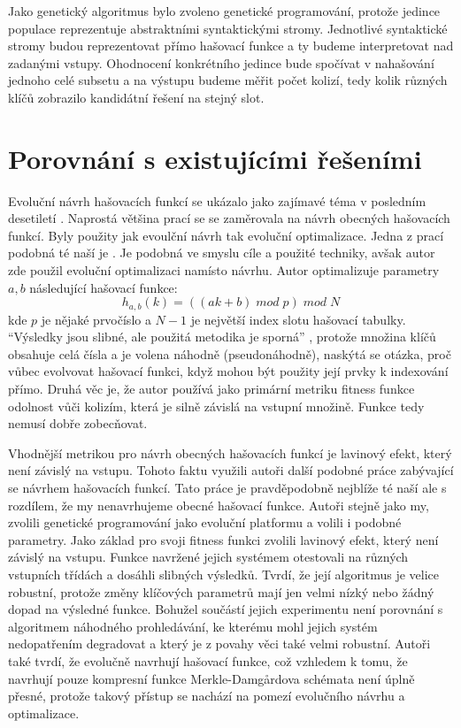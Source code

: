 Jako genetický algoritmus bylo zvoleno genetické programování, protože 
jedince populace reprezentuje abstraktními syntaktickými stromy. Jednotlivé syntaktické 
stromy budou reprezentovat přímo hašovací funkce a ty budeme interpretovat nad zadanými vstupy.
Ohodnocení konkrétního jedince bude spočívat v nahašování jednoho celé subsetu a na výstupu budeme
měřit počet kolizí, tedy kolik různých klíčů zobrazilo kandidátní řešení na stejný slot.

\section{Porovnání s existujícími řešeními}
Evoluční návrh hašovacích funkcí se ukázalo jako zajímavé téma v posledním 
desetiletí \cite{dobai0,NCHF_auto_design,grammar_evolution,safdari}.
Naprostá většina prací se se zaměrovala na návrh obecných hašovacích
funkcí. Byly použity jak evoulční návrh tak evoluční optimalizace. Jedna z prací
podobná té naší je \cite{safdari}. Je podobná ve smyslu cíle a použité techniky,
avšak autor zde použil evoluční optimalizaci namísto návrhu. Autor optimalizuje
parametry $a,b$ následující hašovací funkce:
$$h_{a,b}(k) = ((ak + b) \; mod \; p) \; mod \; N$$
kde $p$ je nějaké prvočíslo a $N - 1$ je největší index slotu hašovací tabulky.
``Výsledky jsou slibné, ale použitá metodika je sporná'' \cite{NCHF_auto_design},
protože množina klíčů obsahuje celá čísla a je volena náhodně (pseudonáhodně), naskýtá se otázka,
proč vůbec evolvovat hašovací funkci, když mohou být použity její prvky k indexování
přímo. Druhá věc je, že autor používá jako primární metriku fitness funkce odolnost
vůči kolizím, která je silně závislá na vstupní množině. Funkce tedy nemusí dobře 
zobecňovat.

Vhodnější metrikou pro návrh obecných hašovacích funkcí je lavinový efekt, který 
není závislý na vstupu. Tohoto faktu využili autoři další podobné práce \cite{NCHF_auto_design}
zabývající se návrhem hašovacích funkcí. Tato práce je pravděpodobně nejblíže té 
naší ale s rozdílem, že my nenavrhujeme obecné hašovací funkce. Autoři stejně jako my,
zvolili genetické programování jako evoluční platformu a volili i podobné parametry.
Jako základ pro svoji fitness funkci zvolili lavinový efekt, který není
závislý na vstupu. Funkce navržené jejich systémem otestovali na různých vstupních třídách
a dosáhli slibných výsledků. Tvrdí, že její algoritmus je velice robustní, protože změny
klíčových parametrů mají jen velmi nízký nebo žádný dopad na výsledné funkce. Bohužel
součástí jejich experimentu není porovnání s algoritmem náhodného prohledávání, ke 
kterému mohl jejich systém nedopatřením degradovat a který je z povahy věci také 
velmi robustní. Autoři také tvrdí, že evolučně navrhují hašovací funkce, což 
vzhledem k tomu, že navrhují pouze kompresní funkce Merkle-Damg\r{a}rdova schémata
není úplně přesné, protože takový přístup se nachází na pomezí evolučního návrhu a optimalizace.

